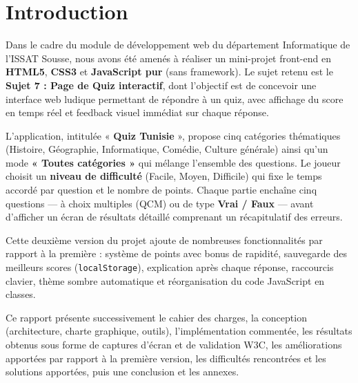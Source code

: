 \documentclass[11pt,a4paper]{article}
\begin{document}
\tableofcontents
\listoffigures
\clearpage
{}

\section{Introduction}
Dans le cadre du module de développement web du département Informatique de l'ISSAT
Sousse, nous avons été amenés à réaliser un mini-projet front-end en \textbf{HTML5},
\textbf{CSS3} et \textbf{JavaScript pur} (sans framework). Le sujet retenu est le
\textbf{Sujet 7 : Page de Quiz interactif}, dont l'objectif est de concevoir une interface
web ludique permettant de répondre à un quiz, avec affichage du score en temps réel et
feedback visuel immédiat sur chaque réponse.

L'application, intitulée « \textbf{Quiz Tunisie} », propose cinq catégories thématiques
(Histoire, Géographie, Informatique, Comédie, Culture générale) ainsi qu'un mode
\textbf{« Toutes catégories »} qui mélange l'ensemble des questions. Le joueur choisit
un \textbf{niveau de difficulté} (Facile, Moyen, Difficile) qui fixe le temps accordé par
question et le nombre de points. Chaque partie enchaîne cinq questions --- à choix multiples
(QCM) ou de type \textbf{Vrai / Faux} --- avant d'afficher un écran de résultats détaillé
comprenant un récapitulatif des erreurs.

Cette deuxième version du projet ajoute de nombreuses fonctionnalités par rapport à la
première : système de points avec bonus de rapidité, sauvegarde des meilleurs scores
(\texttt{localStorage}), explication après chaque réponse, raccourcis clavier, thème
sombre automatique et réorganisation du code JavaScript en classes.

Ce rapport présente successivement le cahier des charges, la conception (architecture,
charte graphique, outils), l'implémentation commentée, les résultats obtenus sous forme de
captures d'écran et de validation W3C, les améliorations apportées par rapport à la
première version, les difficultés rencontrées et les solutions apportées, puis une
conclusion et les annexes.

\clearpage
\end{document}
